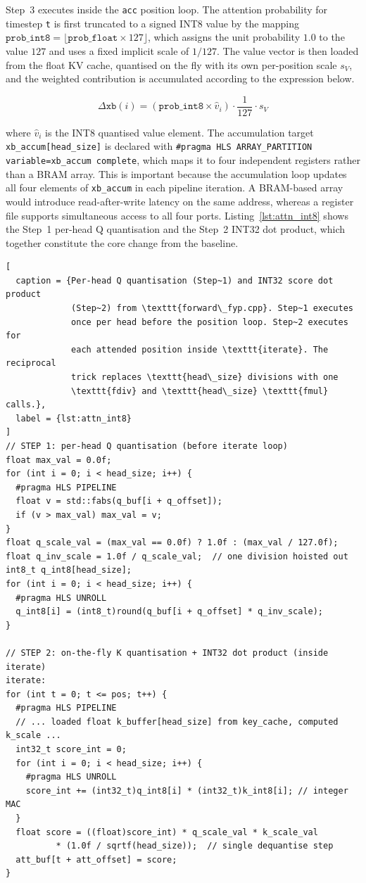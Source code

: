 Step~3 executes inside the \texttt{acc} position loop. The attention
probability for timestep \texttt{t} is first truncated to a signed
INT8 value by the mapping $\texttt{prob\_int8} = \lfloor
\texttt{prob\_float} \times 127 \rfloor$, which assigns the unit
probability $1.0$ to the value $127$ and uses a fixed implicit scale of
$1/127$. The value vector is then loaded from the float KV cache,
quantised on the fly with its own per-position scale $s_V$, and the
weighted contribution is accumulated according to the expression below.

\begin{equation}
  \Delta \texttt{xb}(i) =
    \left(\texttt{prob\_int8} \times \hat{v}_i\right)
    \cdot \frac{1}{127} \cdot s_V
  \label{eq:int8_value_acc}
\end{equation}

\noindent where $\hat{v}_i$ is the INT8 quantised value element. The
accumulation target \texttt{xb\_accum[head\_size]} is declared with
\texttt{\#pragma HLS ARRAY\_PARTITION variable=xb\_accum complete},
which maps it to four independent registers rather than a BRAM array.
This is important because the accumulation loop updates all four
elements of \texttt{xb\_accum} in each pipeline iteration. A BRAM-based
array would introduce read-after-write latency on the same address,
whereas a register file supports simultaneous access to all four ports.
Listing~\ref{lst:attn_int8} shows the Step~1 per-head Q quantisation
and the Step~2 INT32 dot product, which together constitute the core
change from the baseline.

\begin{lstlisting}[
  caption = {Per-head Q quantisation (Step~1) and INT32 score dot product
             (Step~2) from \texttt{forward\_fyp.cpp}. Step~1 executes
             once per head before the position loop. Step~2 executes for
             each attended position inside \texttt{iterate}. The reciprocal
             trick replaces \texttt{head\_size} divisions with one
             \texttt{fdiv} and \texttt{head\_size} \texttt{fmul} calls.},
  label = {lst:attn_int8}
]
// STEP 1: per-head Q quantisation (before iterate loop)
float max_val = 0.0f;
for (int i = 0; i < head_size; i++) {
  #pragma HLS PIPELINE
  float v = std::fabs(q_buf[i + q_offset]);
  if (v > max_val) max_val = v;
}
float q_scale_val = (max_val == 0.0f) ? 1.0f : (max_val / 127.0f);
float q_inv_scale = 1.0f / q_scale_val;  // one division hoisted out
int8_t q_int8[head_size];
for (int i = 0; i < head_size; i++) {
  #pragma HLS UNROLL
  q_int8[i] = (int8_t)round(q_buf[i + q_offset] * q_inv_scale);
}

// STEP 2: on-the-fly K quantisation + INT32 dot product (inside iterate)
iterate:
for (int t = 0; t <= pos; t++) {
  #pragma HLS PIPELINE
  // ... loaded float k_buffer[head_size] from key_cache, computed k_scale ...
  int32_t score_int = 0;
  for (int i = 0; i < head_size; i++) {
    #pragma HLS UNROLL
    score_int += (int32_t)q_int8[i] * (int32_t)k_int8[i]; // integer MAC
  }
  float score = ((float)score_int) * q_scale_val * k_scale_val
          * (1.0f / sqrtf(head_size));  // single dequantise step
  att_buf[t + att_offset] = score;
}
\end{lstlisting}

